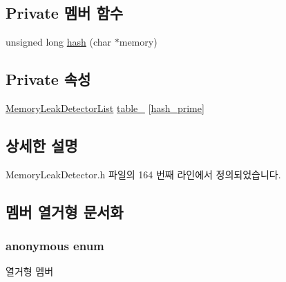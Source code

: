 \subsection*{Private 멤버 함수}
\begin{DoxyCompactItemize}
\item 
unsigned long \hyperlink{struct_memory_leak_detector_table_ac75f34a5bb665fa98b7c96fbbee761ba}{hash} (char $\ast$memory)
\end{DoxyCompactItemize}
\subsection*{Private 속성}
\begin{DoxyCompactItemize}
\item 
\hyperlink{struct_memory_leak_detector_list}{Memory\+Leak\+Detector\+List} \hyperlink{struct_memory_leak_detector_table_acc85a6c3d987233f1bf24811ba473b8d}{table\+\_\+} \mbox{[}\hyperlink{struct_memory_leak_detector_table_a34df7cc7f69a8ec535eec8a524dcbaf9af69a0171f9288f3c7d098803381facbf}{hash\+\_\+prime}\mbox{]}
\end{DoxyCompactItemize}


\subsection{상세한 설명}


Memory\+Leak\+Detector.\+h 파일의 164 번째 라인에서 정의되었습니다.



\subsection{멤버 열거형 문서화}
\subsubsection[{\texorpdfstring{anonymous enum}{anonymous enum}}]{\setlength{\rightskip}{0pt plus 5cm}anonymous enum\hspace{0.3cm}{\ttfamily [private]}}\hypertarget{struct_memory_leak_detector_table_a34df7cc7f69a8ec535eec8a524dcbaf9}{}\label{struct_memory_leak_detector_table_a34df7cc7f69a8ec535eec8a524dcbaf9}
\begin{Desc}
\item[열거형 멤버]\par
\begin{description}
\item[{\em 
hash\+\_\+prime\hypertarget{struct_memory_leak_detector_table_a34df7cc7f69a8ec535eec8a524dcbaf9af69a0171f9288f3c7d098803381facbf}{}\label{struct_memory_leak_detector_table_a34df7cc7f69a8ec535eec8a524dcbaf9af69a0171f9288f3c7d098803381facbf}
}]\end{description}
\end{Desc}


